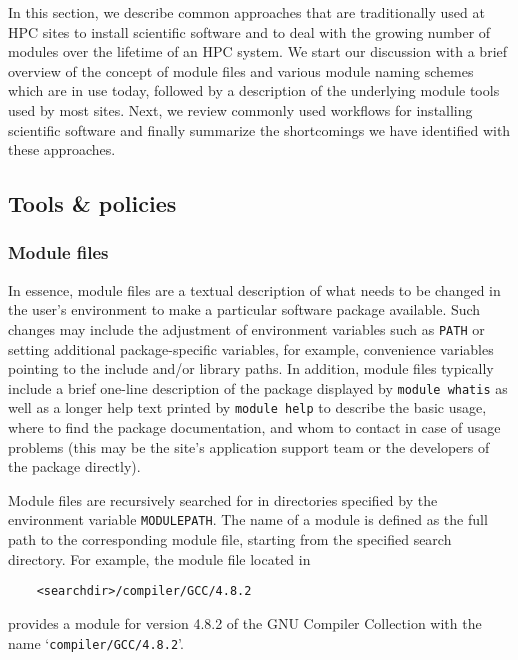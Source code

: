 In this section, we describe common approaches that are traditionally used at
HPC sites to install scientific software and to deal with the growing number
of modules over the lifetime of an HPC system. We start our discussion with a
brief overview of the concept of module files and various module naming
schemes which are in use today, followed by a description of the underlying
module tools used by most sites. Next, we review commonly used workflows for
installing scientific software and finally summarize the shortcomings we have
identified with these approaches.

\subsection{Tools \& policies}

\subsubsection{Module files}
\label{sec:Module_files}

In essence, module files are a textual description of what needs to be
changed in the user's environment to make a particular software package
available. Such changes may include the adjustment of environment variables
such as \texttt{PATH} or setting additional package-specific variables, for
example, convenience variables pointing to the include and/or library paths.
In addition, module files typically include a brief one-line description of
the package displayed by \texttt{module whatis} as well as a longer help text
printed by \texttt{module help} to describe the basic usage, where to find
the package documentation, and whom to contact in case of usage problems
(this may be the site's application support team or the developers of the
package directly).



Module files are recursively searched for in directories specified by the
environment variable \texttt{MODULEPATH}. The name of a module is defined
as the full path to the corresponding module file, starting from the
specified search directory. For example, the module file located in
\begin{verbatim}
    <searchdir>/compiler/GCC/4.8.2
\end{verbatim}
provides a module for version 4.8.2 of the GNU Compiler Collection with the
name `\texttt{compiler/GCC/4.8.2}'.

